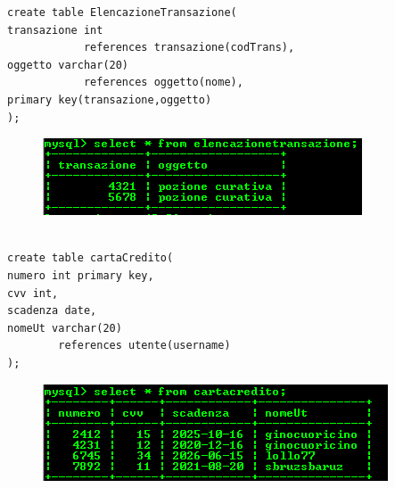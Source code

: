 \begin{verbatim}
create table ElencazioneTransazione( 
transazione int 
			references transazione(codTrans), 
oggetto varchar(20)
			references oggetto(nome), 
primary key(transazione,oggetto)
);
\end{verbatim}

\begin{figure}[H]
\centering
\includegraphics[width=0.7\linewidth]{immagini/29}
\caption{}
\label{fig:1}
\end{figure}

\begin{verbatim}

create table cartaCredito( 
numero int primary key, 
cvv int, 
scadenza date, 
nomeUt varchar(20) 
		references utente(username)
);
\end{verbatim}

\begin{figure}[H]
\centering
\includegraphics[width=0.7\linewidth]{immagini/30}
\caption{}
\label{fig:1}
\end{figure}

\begin{verbatim}

\end{verbatim}
